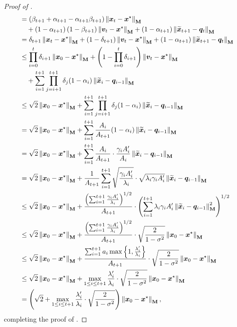 \begin{proof}[Proof of ]
\begin{align*}
    &= \left(\beta_{t+1}+\alpha_{t+1}-\alpha_{t+1}\beta_{t+1}\right)\left\lVert \bm{x}_t-\bm{x}^{\star} \right\rVert_{\mathbf{M}} \\
    &\quad + \left(1-\alpha_{t+1}\right)\left(1-\beta_{t+1}\right)\left\lVert \bm{v}_t-\bm{x}^{\star} \right\rVert_{\mathbf{M}} + \left(1-\alpha_{t+1}\right)\left\lVert \widetilde{\bm{x}}_{t+1}-\bm{q}_t \right\rVert_{\mathbf{M}} \\
    &= \delta_{t+1}\left\lVert \bm{x}_t-\bm{x}^{\star} \right\rVert_{\mathbf{M}} + (1-\delta_{t+1})\left\lVert \bm{v}_t-\bm{x}^{\star} \right\rVert_{\mathbf{M}} + \left(1-\alpha_{t+1}\right)\left\lVert \widetilde{\bm{x}}_{t+1}-\bm{q}_t \right\rVert_{\mathbf{M}} \\
    &\le \prod_{i=0}^t \delta_{i+1}\left\lVert \bm{x}_0-\bm{x}^{\star} \right\rVert_{\mathbf{M}} + \left(1-\prod_{i=0}^t \delta_{i+1}\right)\left\lVert \bm{v}_t-\bm{x}^{\star} \right\rVert_{\mathbf{M}} \\
    &\quad + \sum_{i=1}^{t+1} \prod_{j=i+1}^{t+1}\delta_{j}(1-\alpha_{i})\left\lVert \widetilde{\bm{x}}_{i}-\bm{q}_{i-1} \right\rVert_{\mathbf{M}} \\
    &\le \sqrt{2}\left\lVert \bm{x}_0-\bm{x}^{\star} \right\rVert_{\mathbf{M}} + \sum_{i=1}^{t+1} \prod_{j=i+1}^{t+1}\delta_{j}(1-\alpha_{i})\left\lVert \widetilde{\bm{x}}_{i}-\bm{q}_{i-1} \right\rVert_{\mathbf{M}} \\
    &= \sqrt{2}\left\lVert \bm{x}_0-\bm{x}^{\star} \right\rVert_{\mathbf{M}} + \sum_{i=1}^{t+1} \frac{A_i}{A_{t+1}}(1-\alpha_{i})\left\lVert \widetilde{\bm{x}}_{i}-\bm{q}_{i-1} \right\rVert_{\mathbf{M}} \\
    &= \sqrt{2}\left\lVert \bm{x}_0-\bm{x}^{\star} \right\rVert_{\mathbf{M}} + \sum_{i=1}^{t+1} \frac{A_i}{A_{t+1}}\cdot\frac{\gamma_iA_i'}{A_i}\left\lVert \widetilde{\bm{x}}_{i}-\bm{q}_{i-1} \right\rVert_{\mathbf{M}} \\
    &= \sqrt{2}\left\lVert \bm{x}_0-\bm{x}^{\star} \right\rVert_{\mathbf{M}} + \frac{1}{A_{t+1}}\sum_{i=1}^{t+1} \sqrt{\frac{\gamma_iA_i'}{\lambda_i}} \cdot \sqrt{\lambda_i\gamma_iA_i'}\left\lVert \widetilde{\bm{x}}_{i}-\bm{q}_{i-1} \right\rVert_{\mathbf{M}} \\
    &\le \sqrt{2}\left\lVert \bm{x}_0-\bm{x}^{\star} \right\rVert_{\mathbf{M}} + \frac{\left(\sum_{i=1}^{t+1} \frac{\gamma_iA_i'}{\lambda_i}\right)^{1/2}}{A_{t+1}} \cdot \left(\sum_{i=1}^{t+1} \lambda_i\gamma_iA_i'\left\lVert \widetilde{\bm{x}}_{i}-\bm{q}_{i-1} \right\rVert_{\mathbf{M}}^2\right)^{1/2} \\
    &\le \sqrt{2}\left\lVert \bm{x}_0-\bm{x}^{\star} \right\rVert_{\mathbf{M}} + \frac{\left(\sum_{i=1}^{t+1} \frac{\gamma_iA_i'}{\lambda_i}\right)^{1/2}}{A_{t+1}} \cdot \sqrt{\frac{2}{1-\sigma^2}}\left\lVert \bm{x}_0-\bm{x}^{\star} \right\rVert_{\mathbf{M}} \\
    &\le \sqrt{2}\left\lVert \bm{x}_0-\bm{x}^{\star} \right\rVert_{\mathbf{M}} + \frac{\sum_{i=1}^{t+1} a_i\max\left\{1,\frac{\lambda_i'}{\lambda_i}\right\}}{A_{t+1}} \cdot \sqrt{\frac{2}{1-\sigma^2}}\left\lVert \bm{x}_0-\bm{x}^{\star} \right\rVert_{\mathbf{M}} \\
    &\le \sqrt{2}\left\lVert \bm{x}_0-\bm{x}^{\star} \right\rVert_{\mathbf{M}} + \max_{1 \le i \le t+1} \frac{\lambda_i'}{\lambda_i} \cdot \sqrt{\frac{2}{1-\sigma^2}}\left\lVert \bm{x}_0-\bm{x}^{\star} \right\rVert_{\mathbf{M}} \\
    &= \left(\sqrt{2}+\max_{1 \le i \le t+1} \frac{\lambda_i'}{\lambda_i} \cdot \sqrt{\frac{2}{1-\sigma^2}}\right)\left\lVert \bm{x}_0-\bm{x}^{\star} \right\rVert_{\mathbf{M}},
\end{align*}
completing the proof of .
\end{proof}


